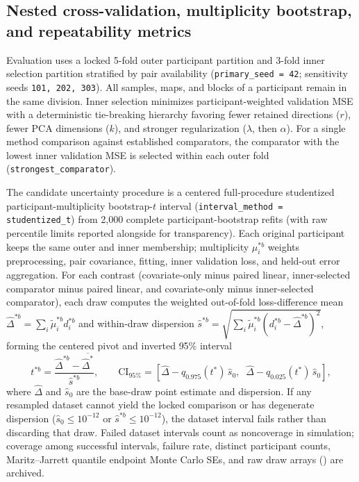 \documentclass[preprint,12pt]{elsarticle}
\begin{document}
\subsection{Nested cross-validation, multiplicity bootstrap, and repeatability metrics}
\label{subsec:validation}

Evaluation uses a locked 5-fold outer participant partition and 3-fold inner selection partition stratified by pair availability (\texttt{primary\_seed = 42}; sensitivity seeds \texttt{101, 202, 303}). All samples, maps, and blocks of a participant remain in the same division. Inner selection minimizes participant-weighted validation MSE with a deterministic tie-breaking hierarchy favoring fewer retained directions ($r$), fewer PCA dimensions ($k$), and stronger regularization ($\lambda$, then $\alpha$). For a single method comparison against established comparators, the comparator with the lowest inner validation MSE is selected within each outer fold (\texttt{strongest\_comparator}).

The candidate uncertainty procedure is a centered full-procedure studentized participant-multiplicity bootstrap-$t$ interval (\texttt{interval\_method = studentized\_t}) from 2,000 complete participant-bootstrap refits (with raw percentile limits reported alongside for transparency). Each original participant keeps the same outer and inner membership; multiplicity $\mu_i^{*b}$ weights preprocessing, pair covariance, fitting, inner validation loss, and held-out error aggregation. For each contrast (covariate-only minus paired linear, inner-selected comparator minus paired linear, and covariate-only minus inner-selected comparator), each draw computes the weighted out-of-fold loss-difference mean $\widehat{\Delta}^{*b} = \sum_i \tilde{\mu}_i^{*b} d_i^{*b}$ and within-draw dispersion $\hat{s}^{*b} = \sqrt{\sum_i \tilde{\mu}_i^{*b}(d_i^{*b} - \widehat{\Delta}^{*b})^2}$, forming the centered pivot and inverted 95\% interval
\begin{equation}
t^{*b} = \frac{\widehat{\Delta}^{*b} - \overline{\widehat{\Delta}^*}}{\hat{s}^{*b}}, \qquad
\mathrm{CI}_{95\%} = \left[\widehat{\Delta} - q_{0.975}(t^*)\,\hat{s}_0,\;\; \widehat{\Delta} - q_{0.025}(t^*)\,\hat{s}_0\right],
\label{eq:studentized_t}
\end{equation}
where $\widehat{\Delta}$ and $\hat{s}_0$ are the base-draw point estimate and dispersion. If any resampled dataset cannot yield the locked comparison or has degenerate dispersion ($\hat{s}_0 \le 10^{-12}$ or $\hat{s}^{*b} \le 10^{-12}$), the dataset interval fails rather than discarding that draw. Failed dataset intervals count as noncoverage in simulation; coverage among successful intervals, failure rate, distinct participant counts, Maritz--Jarrett quantile endpoint Monte Carlo SEs, and raw draw arrays () are archived.
\end{document}

